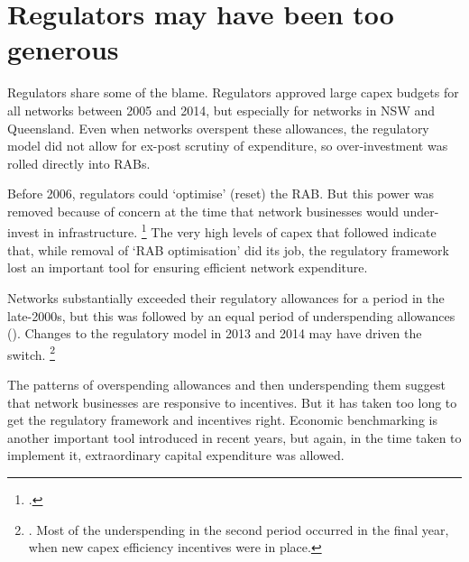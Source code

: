 \documentclass[FrontPage]{grattan}
\begin{document}
\clearpage

\section{Regulators may have been too generous}\label{sec:regulators-allowed-capex-and-rolled-overspend-into-RABs}

Regulators share some of the blame. Regulators approved large capex budgets for all networks between 2005 and 2014, but especially for networks in NSW and Queensland. Even when networks overspent these allowances, the regulatory model did not allow for ex-post scrutiny of expenditure, so over-investment was rolled directly into RABs.

Before 2006, regulators could `optimise' (reset) the RAB\@. But this power was removed because of concern at the time that network businesses would under-invest in infrastructure.%
\footcites{AEMC2006RABOptimisationRule}{simshauser2017monopoly}{Price2018FebSpeechOnNetworks}
The very high levels of capex that followed indicate that, while removal of `RAB optimisation' did its job, the regulatory framework lost an important tool for ensuring efficient network expenditure.

Networks substantially exceeded their regulatory allowances for a period in the late-2000s, but this was followed by an equal period of underspending allowances (). Changes to the regulatory model in 2013 and 2014 may have driven the switch.%
\footnote{\textcites{AER2014betterregulation}{AER2013capexincentives}{AEMC2012EconomicRegulationNetwork}. Most of the underspending in the second period occurred in the final year, when new capex efficiency incentives were in place.}

The patterns of overspending allowances and then underspending them suggest that network businesses are responsive to incentives. But it has taken too long to get the regulatory framework and incentives right. Economic benchmarking is another important tool introduced in recent years, but again, in the time taken to implement it, extraordinary capital expenditure was allowed.
\end{document}
